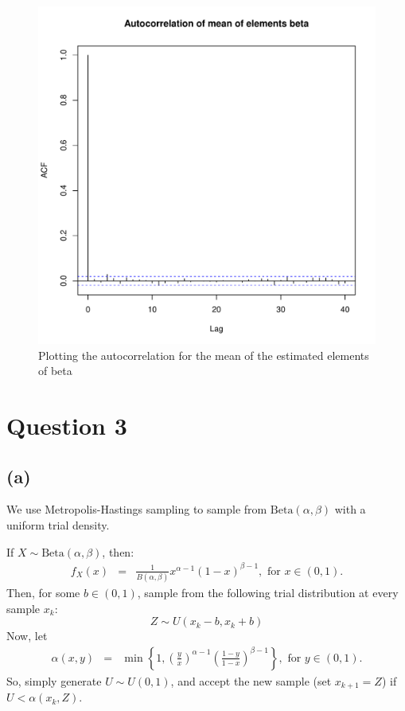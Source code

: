 \documentclass{article}\usepackage[]{graphicx}\usepackage[]{color}
\makeatletter
\def\maxwidth{ %
  \ifdim\Gin@nat@width>\linewidth
    \linewidth
  \else
    \Gin@nat@width
  \fi
}
\newenvironment{knitrout}{}{} %
\newcommand{\lb}{\left\{}
\newcommand{\rb}{\right\}}
\makeatother
\begin{document}
\begin{knitrout}
\color{fgcolor}\begin{figure}
\includegraphics[width=\maxwidth]{figure/acf1-1} \caption[Plotting the autocorrelation for the mean of the estimated elements of beta]{Plotting the autocorrelation for the mean of the estimated elements of beta}\label{fig:acf1}
\end{figure}


\end{knitrout}

\section*{Question 3}
\subsection*{(a)}
We use Metropolis-Hastings sampling to sample from $\mbox{Beta}(\alpha,\beta)$ with a uniform trial density.

If $X\sim \mbox{Beta}(\alpha,\beta)$, then:
\begin{eqnarray*}
  f_X(x) &=& \frac{1}{B(\alpha,\beta)}x^{\alpha-1}(1-x)^{\beta-1}, \mbox{ for } x\in(0,1).
\end{eqnarray*}
Then, for some $b\in (0,1)$, sample from the following trial distribution at every sample $x_k$: $$ Z\sim U(x_k-b,x_k+b) $$
Now, let 
\begin{eqnarray*}
  \alpha(x,y) &=& \min\lb 1, \left(\frac{y}{x}\right)^{\alpha-1}\left(\frac{1-y}{1-x}\right)^{\beta-1} \rb, \mbox{ for } y\in (0,1).
\end{eqnarray*}
So, simply generate $U\sim U(0,1)$, and accept the new sample (set $x_{k+1}=Z$) if $U<\alpha(x_k, Z)$.
\end{document}
